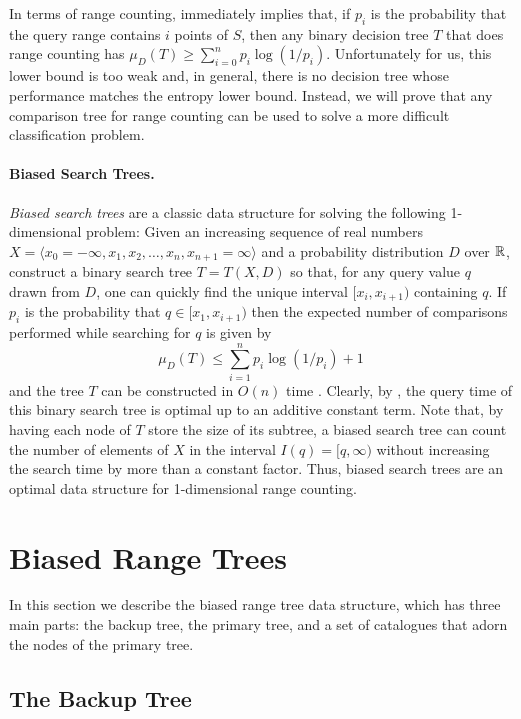 \documentclass[lotsofwhite,charterfonts]{patmorin}
\begin{document}
In terms of range counting,  immediately implies that,
if $p_i$ is the probability that the query range contains $i$ points
of $S$, then any binary decision tree $T$ that does range counting has
$\mu_D(T) \ge \sum_{i=0}^{n} p_i\log(1/p_i)$.  Unfortunately for us,
this lower bound is too weak and, in general, there is no decision
tree whose performance matches the entropy lower bound.
Instead, we will prove that any comparison tree for range counting
can be used to solve a more difficult classification problem.

\paragraph{Biased Search Trees.}

\emph{Biased search trees} are a classic data structure for solving
the following 1-dimensional problem:  Given an increasing sequence of
real numbers $X=\langle x_0=-\infty,x_1,x_2,\ldots ,
x_n,x_{n+1}=\infty\rangle$ and a probability distribution $D$ over
$\mathbb{R}$, construct a binary search tree  $T=T(X,D)$ so that, for any
query value $q$ drawn from $D$, one can quickly find the unique
interval $[x_i,x_{i+1})$ containing $q$.  If $p_i$ is the probability
that $q\in[x_1,x_{i+1})$ then the expected number of comparisons
performed while searching for $q$ is given
by
\[
   \mu_D(T) \le \sum_{i=1}^{n} p_i\log(1/p_i) + 1 
\]
and the tree $T$ can be constructed in $O(n)$ time \cite{m75}.
Clearly, by , the query time of this binary search
tree is optimal up to an additive constant term.  Note that, by having
each node of $T$ store the size of its subtree, a biased search tree
can count the number of elements of $X$ in the interval
$I(q)=[q,\infty)$ without increasing the search time by more than a
constant factor.  Thus, biased search trees are an optimal data
structure for 1-dimensional range counting.

\section{Biased Range Trees}

In this section we describe the biased range tree data structure,
which has three main parts: the backup tree, the primary tree, and a
set of catalogues that adorn the nodes of the primary tree.

\subsection{The Backup Tree}
\end{document}
